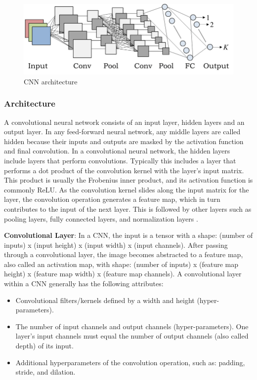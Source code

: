 \documentclass[11pt]{article}
\begin{document}
	\begin{figure}[h]
		\centering
		\includegraphics[width=0.8\linewidth]{imgs/cnn_arch.png}
		\caption{CNN architecture}%
		\label{CNN Architecture}
	\end{figure}

	\subsubsection{Architecture}

	A convolutional neural network consists of an input layer, hidden layers and
	an output layer. In any feed-forward neural network, any middle layers are
	called hidden because their inputs and outputs are masked by the activation
	function and final convolution. In a convolutional neural network, the
	hidden layers include layers that perform convolutions. Typically this
	includes a layer that performs a dot product of the convolution kernel with
	the layer's input matrix.  This product is usually the Frobenius inner
	product, and its activation function is commonly ReLU. As the convolution
	kernel slides along the input matrix for the layer, the convolution
	operation generates a feature map, which in turn contributes to the input of
	the next layer. This is followed by other layers such as pooling layers,
	fully connected layers, and normalization layers \cite{covnet_arch}.

	\textbf{Convolutional Layer}:
	In a CNN, the input is a tensor with a shape: (number of inputs) x (input
	height) x (input width) x (input channels). After passing through a
	convolutional layer, the image becomes abstracted to a feature map, also
	called an activation map, with shape: (number of inputs) x (feature map
	height) x (feature map width) x (feature map channels). A convolutional
	layer within a CNN generally has the following attributes:

	\begin{itemize}
		\item Convolutional filters/kernels defined by a width and height (hyper-parameters).
		\item The number of input channels and output channels
			(hyper-parameters). One layer's input channels must equal the number
			of output channels (also called depth) of its input.
		\item Additional hyperparameters of the convolution operation, such as:
			padding, stride, and dilation.
	\end{itemize}
\end{document}
